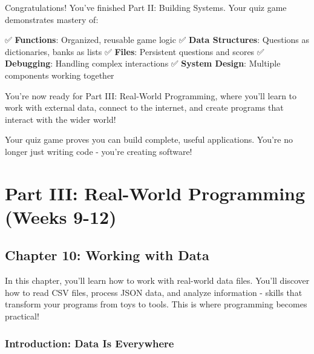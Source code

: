 \documentclass[
  letterpaper,
  DIV=11,
  numbers=noendperiod,
  oneside]{scrreprt}
\begin{document}
Congratulations! You've finished Part II: Building Systems. Your quiz
game demonstrates mastery of:

✅ \textbf{Functions}: Organized, reusable game logic ✅ \textbf{Data
Structures}: Questions as dictionaries, banks as lists ✅
\textbf{Files}: Persistent questions and scores ✅ \textbf{Debugging}:
Handling complex interactions ✅ \textbf{System Design}: Multiple
components working together

You're now ready for Part III: Real-World Programming, where you'll
learn to work with external data, connect to the internet, and create
programs that interact with the wider world!

Your quiz game proves you can build complete, useful applications.
You're no longer just writing code - you're creating software! 🌟

\part{Part III: Real-World Programming (Weeks 9-12)}

\chapter{Chapter 10: Working with Data}\label{sec-working-with-data}

\begin{tcolorbox}[enhanced jigsaw, opacityback=0, colback=white, colframe=quarto-callout-note-color-frame, breakable, titlerule=0mm, coltitle=black, rightrule=.15mm, colbacktitle=quarto-callout-note-color!10!white, left=2mm, bottomtitle=1mm, bottomrule=.15mm, title=\textcolor{quarto-callout-note-color}{\faInfo}\hspace{0.5em}{Chapter Summary}, opacitybacktitle=0.6, toptitle=1mm, leftrule=.75mm, arc=.35mm, toprule=.15mm]

In this chapter, you'll learn how to work with real-world data files.
You'll discover how to read CSV files, process JSON data, and analyze
information - skills that transform your programs from toys to tools.
This is where programming becomes practical!

\end{tcolorbox}

\section{Introduction: Data Is
Everywhere}\label{introduction-data-is-everywhere}
\end{document}
